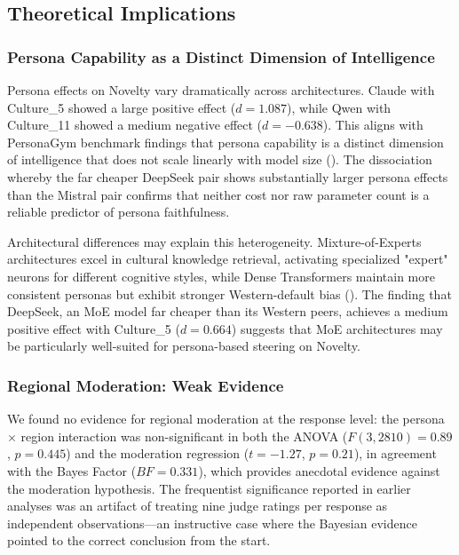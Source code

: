\documentclass{article}
\begin{document}
\subsection{Theoretical Implications}

\subsubsection{Persona Capability as a Distinct Dimension of Intelligence}

Persona effects on Novelty vary dramatically across architectures. Claude with Culture\_5 showed a large positive effect (\(d = 1.087\)), while Qwen with Culture\_11 showed a medium negative effect (\(d = -0.638\)). This aligns with PersonaGym benchmark findings that persona capability is a distinct dimension of intelligence that does not scale linearly with model size (\cite{vinay_samuel_301ec4c0}). The dissociation whereby the far cheaper DeepSeek pair shows substantially larger persona effects than the Mistral pair confirms that neither cost nor raw parameter count is a reliable predictor of persona faithfulness.

Architectural differences may explain this heterogeneity. Mixture-of-Experts architectures excel in cultural knowledge retrieval, activating specialized "expert" neurons for different cognitive styles, while Dense Transformers maintain more consistent personas but exhibit stronger Western-default bias (\cite{reem_i__masoud_f9cde5f1, xinyu_zhang_c810e609}). The finding that DeepSeek, an MoE model far cheaper than its Western peers, achieves a medium positive effect with Culture\_5 (\(d = 0.664\)) suggests that MoE architectures may be particularly well-suited for persona-based steering on Novelty.

\subsubsection{Regional Moderation: Weak Evidence}

We found no evidence for regional moderation at the response level: the persona \(\times\) region interaction was non-significant in both the ANOVA (\(F(3, 2810) = 0.89\), \(p = 0.445\)) and the moderation regression (\(t = -1.27\), \(p = 0.21\)), in agreement with the Bayes Factor (\(BF = 0.331\)), which provides anecdotal evidence against the moderation hypothesis. The frequentist significance reported in earlier analyses was an artifact of treating nine judge ratings per response as independent observations---an instructive case where the Bayesian evidence pointed to the correct conclusion from the start.
\end{document}
